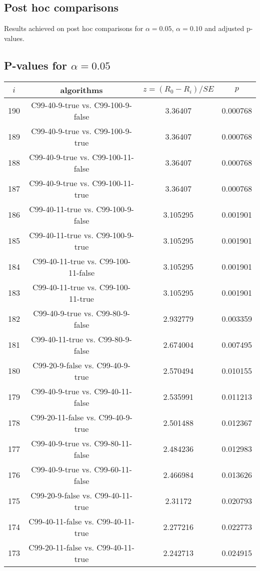 \documentclass[a4paper,10pt]{article}
\begin{document}
\begin{landscape}
\pagebreak

\section{Post hoc comparisons}

Results achieved on post hoc comparisons for $\alpha = 0.05$, $\alpha = 0.10$ and adjusted p-values.

\subsection{P-values for $\alpha=0.05$}

\begin{table}[!htp]
\centering\scriptsize
\begin{tabular}{cccc}
$i$&algorithms&$z=(R_0 - R_i)/SE$&$p$\\
\hline190&C99-40-9-true vs. C99-100-9-false&3.36407&0.000768\\
189&C99-40-9-true vs. C99-100-9-true&3.36407&0.000768\\
188&C99-40-9-true vs. C99-100-11-false&3.36407&0.000768\\
187&C99-40-9-true vs. C99-100-11-true&3.36407&0.000768\\
186&C99-40-11-true vs. C99-100-9-false&3.105295&0.001901\\
185&C99-40-11-true vs. C99-100-9-true&3.105295&0.001901\\
184&C99-40-11-true vs. C99-100-11-false&3.105295&0.001901\\
183&C99-40-11-true vs. C99-100-11-true&3.105295&0.001901\\
182&C99-40-9-true vs. C99-80-9-false&2.932779&0.003359\\
181&C99-40-11-true vs. C99-80-9-false&2.674004&0.007495\\
180&C99-20-9-false vs. C99-40-9-true&2.570494&0.010155\\
179&C99-40-9-true vs. C99-40-11-false&2.535991&0.011213\\
178&C99-20-11-false vs. C99-40-9-true&2.501488&0.012367\\
177&C99-40-9-true vs. C99-80-11-false&2.484236&0.012983\\
176&C99-40-9-true vs. C99-60-11-false&2.466984&0.013626\\
175&C99-20-9-false vs. C99-40-11-true&2.31172&0.020793\\
174&C99-40-11-false vs. C99-40-11-true&2.277216&0.022773\\
173&C99-20-11-false vs. C99-40-11-true&2.242713&0.024915\\

\end{tabular}
\end{table}
\end{landscape}
\end{document}
